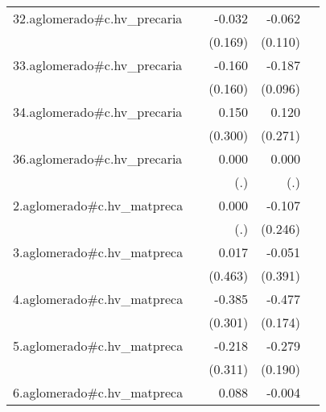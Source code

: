 {\begin{longtable}{l*{4}{D{.}{.}{-1}}}
\addlinespace
32.aglomerado#c.hv\_precaria&                     &      -0.032         &      -0.062         &                     \\
            &                     &     (0.169)         &     (0.110)         &                     \\
\addlinespace
33.aglomerado#c.hv\_precaria&                     &      -0.160         &      -0.187         &                     \\
            &                     &     (0.160)         &     (0.096)         &                     \\
\addlinespace
34.aglomerado#c.hv\_precaria&                     &       0.150         &       0.120         &                     \\
            &                     &     (0.300)         &     (0.271)         &                     \\
\addlinespace
36.aglomerado#c.hv\_precaria&                     &       0.000         &       0.000         &                     \\
            &                     &         (.)         &         (.)         &                     \\
\addlinespace
2.aglomerado#c.hv\_matpreca&                     &       0.000         &      -0.107         &                     \\
            &                     &         (.)         &     (0.246)         &                     \\
\addlinespace
3.aglomerado#c.hv\_matpreca&                     &       0.017         &      -0.051         &                     \\
            &                     &     (0.463)         &     (0.391)         &                     \\
\addlinespace
4.aglomerado#c.hv\_matpreca&                     &      -0.385         &      -0.477\sym{**} &                     \\
            &                     &     (0.301)         &     (0.174)         &                     \\
\addlinespace
5.aglomerado#c.hv\_matpreca&                     &      -0.218         &      -0.279         &                     \\
            &                     &     (0.311)         &     (0.190)         &                     \\
\addlinespace
6.aglomerado#c.hv\_matpreca&                     &       0.088         &      -0.004         &                     \\

\end{longtable}}

